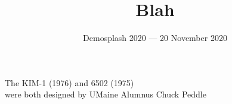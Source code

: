 \documentclass[30pt,landscape]{foils}
\begin{document}
\title {
Blah
}

\author {
}
\date{
\vspace{3.5ex}
Demosplash 2020 --- 20 November 2020}
\maketitle

\LogoOff







\begin{center}
The KIM-1 (1976) and 6502 (1975)\\ were both designed by UMaine Alumnus Chuck Peddle
\end{center}
\end{document}
